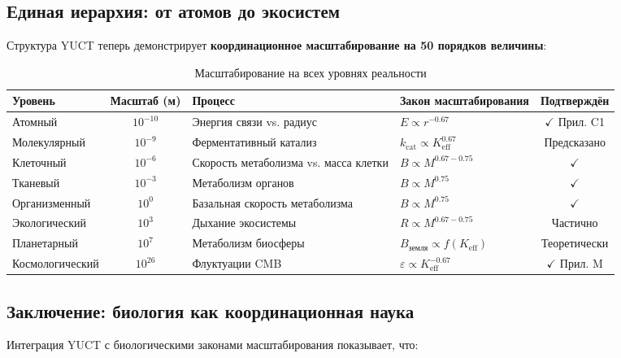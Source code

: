 \documentclass[12pt]{article}
\newcommand{\Keff}{K_{\mathrm{eff}}}
\begin{document}
	\subsection{Единая иерархия: от атомов до экосистем}
	
	Структура YUCT теперь демонстрирует \textbf{координационное масштабирование на 50 порядков величины}:
	
	\begin{table}[htbp]
		\centering
		\caption{Масштабирование на всех уровнях реальности}
		\label{tab:unified-hierarchy}
		\begin{tabular}{p{3cm} c p{4cm} p{3cm} c}
			\toprule
			\textbf{Уровень} & \textbf{Масштаб (м)} & \textbf{Процесс} & \textbf{Закон масштабирования} & \textbf{Подтверждён} \\
			\midrule
			Атомный      & \(10^{-10}\) & Энергия связи vs. радиус & \(E \propto r^{-0.67}\) & $\checkmark$ Прил. C1 \\
			Молекулярный & \(10^{-9}\)  & Ферментативный катализ        & \(k_{\text{cat}} \propto \Keff^{0.67}\) & Предсказано \\
			Клеточный    & \(10^{-6}\)  & Скорость метаболизма vs. масса клетки & \(B \propto M^{0.67-0.75}\) & $\checkmark$ \cite{Takemoto2015} \\
			Тканевый     & \(10^{-3}\)  & Метаболизм органов        & \(B \propto M^{0.75}\) & $\checkmark$ \cite{West2002} \\
			Организменный & \(10^{0}\)   & Базальная скорость метаболизма    & \(B \propto M^{0.75}\) & $\checkmark$ \cite{Kleiber1932} \\
			Экологический & \(10^{3}\)   & Дыхание экосистемы   & \(R \propto M^{0.67-0.75}\) & Частично \\
			Планетарный   & \(10^{7}\)   & Метаболизм биосферы    & \(B_{\text{земля}} \propto f(\Keff)\) & Теоретически \\
			Космологический& \(10^{26}\)  & Флуктуации CMB        & \(\varepsilon \propto \Keff^{-0.67}\) & $\checkmark$ Прил. M \\
			\bottomrule
		\end{tabular}
	\end{table}
	
	\subsection{Заключение: биология как координационная наука}
	
	Интеграция YUCT с биологическими законами масштабирования показывает, что:
	
\end{document}
